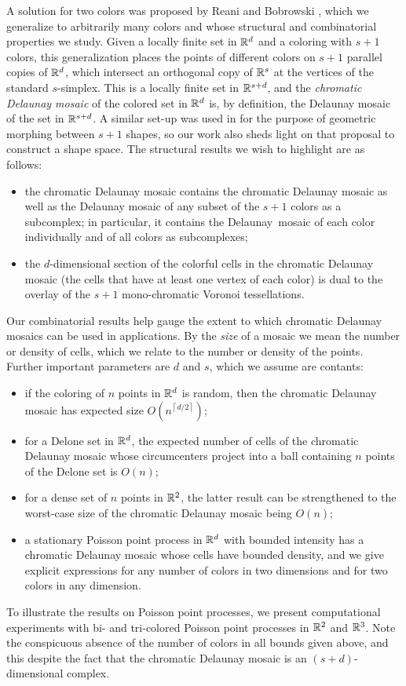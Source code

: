 \documentclass[a4paper]{article}
\newcommand {\mm}[1]   {\ifmmode{#1}\else{\mbox{\(#1\)}}\fi}
\newcommand {\ceiling}[1] {{\left\lceil #1 \right\rceil}}
\newcommand{\Rspace}        {\mm{{\mathbb R}}}
\theoremstyle{definition}
\numberwithin{theorem}{section}
\numberwithin{equation}{section}
\begin{document}
\medskip
A solution for two colors was proposed by Reani and Bobrowski \cite{ReBo21}, which we generalize to arbitrarily many colors and whose structural and combinatorial properties we study.
Given a locally finite set in $\Rspace^d$ and a coloring with $s+1$ colors, this generalization places the points of different colors on $s+1$ parallel copies of $\Rspace^d$, which intersect an orthogonal copy of $\Rspace^s$ at the vertices of the standard $s$-simplex.
This is a locally finite set in $\Rspace^{s+d}$, and the \emph{chromatic Delaunay mosaic} of the colored set in $\Rspace^d$ is, by definition, the Delaunay mosaic of the set in $\Rspace^{s+d}$.
A similar set-up was used in \cite{CEF01} for the purpose of geometric morphing between $s+1$ shapes, so our work also sheds light on that proposal to construct a shape space.
The structural results we wish to highlight are as follows:
\medskip \begin{itemize}
  \item the chromatic Delaunay mosaic contains the chromatic Delaunay mosaic as well as the Delaunay mosaic of any subset of the $s+1$ colors as a subcomplex; in particular, it contains the Delaunay~mosaic of each color individually and of all colors as subcomplexes;
  \item the $d$-dimensional section of the colorful cells in the chromatic Delaunay mosaic (the cells that have at least one vertex of each color) is dual to the overlay of the $s+1$ mono-chromatic Voronoi tessellations.
\end{itemize} \medskip
Our combinatorial results help gauge the extent to which chromatic Delaunay mosaics can be used in applications.
By the \emph{size} of a mosaic we mean the number or density of cells, which we relate to the number or density of the points.
Further important parameters are $d$ and $s$, which we assume are contants:
\medskip \begin{itemize}
  \item if the coloring of $n$ points in $\Rspace^d$ is random, then the chromatic Delaunay mosaic has expected size $O(n^{\ceiling{d/2}})$;
  \item for a Delone set in $\Rspace^d$, the expected number of cells of the chromatic Delaunay mosaic whose circumcenters project into a ball containing $n$ points of the Delone set is $O(n)$;
  \item for a dense set of $n$ points in $\Rspace^2$, the latter result can be strengthened to the worst-case size of the chromatic Delaunay mosaic being $O(n)$;
  \item a stationary Poisson point process in $\Rspace^d$ with bounded intensity has a chromatic Delaunay mosaic whose cells have bounded density, and we give explicit expressions for any number of colors in two dimensions and for two colors in any dimension.
\end{itemize} \medskip
To illustrate the results on Poisson point processes, we present computational experiments with bi- and tri-colored Poisson point processes in $\Rspace^2$ and $\Rspace^3$.
Note the conspicuous absence of the number of colors in all bounds given above, and this despite the fact that the chromatic Delaunay mosaic is an $(s+d)$-dimensional complex.
\end{document}
